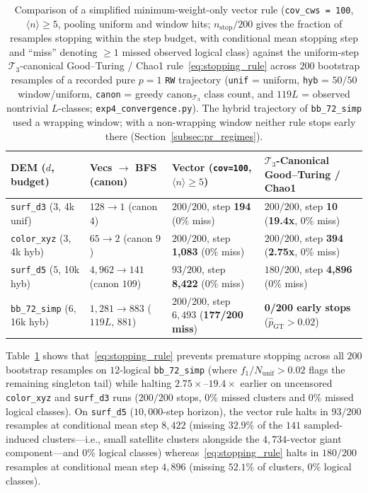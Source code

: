 \documentclass[12pt]{article}
\theoremstyle{definition}
\newcommand{\Tc}{\mathcal{T}_3}
\newcommand{\ttt}[1]{\texttt{#1}}
\begin{document}
\begin{table}[htbp]
\centering
\caption{Comparison of a simplified minimum-weight-only vector rule (\ttt{cov\_cws = 100}, $\langle n \rangle \ge
5$, pooling uniform and window hits; $n_{\mathrm{stop}}/200$ gives the fraction of resamples stopping within the
step budget, with conditional mean stopping step and ``miss'' denoting $\ge 1$ missed observed logical class)
against the uniform-step $\Tc$-canonical Good--Turing / Chao1 rule~\eqref{eq:stopping_rule} across $200$ bootstrap
resamples of a recorded pure $p = 1$ \ttt{RW} trajectory (\ttt{unif} = uniform, \ttt{hyb} = $50/50$ window/uniform,
\ttt{canon} = greedy $\mathrm{canon}_{\Tc}$ class count, and $119L$ = observed nontrivial $L$-classes;
\ttt{exp4\_convergence.py}). The hybrid trajectory of \ttt{bb\_72\_simp} used a wrapping window; with a non-wrapping
window neither rule stops early there (Section~\ref{subsec:pr_regimes}).}\label{tab:conv_bench}
\smallskip
\scriptsize
\setlength{\tabcolsep}{2.3pt}
\begin{tabular}{@{}llll@{}}
\toprule
DEM ($d$, budget) & Vecs $\to$ BFS (canon) & Vector (\ttt{cov=100}, $\langle n \rangle \ge 5$) &
  $\Tc$-Canonical Good--Turing / Chao1 \\
\midrule
\ttt{surf\_d3} ($3$, 4k unif) & $128 \to 1$ (canon $4$) & $200/200$, step \textbf{194} ($0\%$ miss) &
  $200/200$, step \textbf{10} (\textbf{19.4x}, $0\%$ miss) \\
\ttt{color\_xyz} ($3$, 4k hyb) & $65 \to 2$ (canon $9$) & $200/200$, step \textbf{1,083} ($0\%$ miss) &
  $200/200$, step \textbf{394} (\textbf{2.75x}, $0\%$ miss) \\
\ttt{surf\_d5} ($5$, 10k hyb) & $4{,}962 \to 141$ (canon $109$) & $93/200$, step \textbf{8,422} ($0\%$ miss) &
  $180/200$, step \textbf{4,896} ($0\%$ miss) \\
\ttt{bb\_72\_simp} ($6$, 16k hyb) & $1{,}281 \to 883$ ($119L$, $881$) & $200/200$, step $6{,}493$ (\textbf{177/200
  miss}) & \textbf{0/200 early stops} ($\hat{p}_{\mathrm{GT}}{>}0.02$) \\
\bottomrule
\end{tabular}
\end{table}

Table~\ref{tab:conv_bench} shows that~\eqref{eq:stopping_rule} prevents premature stopping across all $200$
bootstrap resamples on $12$-logical \ttt{bb\_72\_simp} (where $f_1 / N_{\mathrm{unif}} > 0.02$ flags the remaining
singleton tail) while halting $2.75\times$--$19.4\times$ earlier on uncensored \ttt{color\_xyz} and \ttt{surf\_d3}
runs ($200/200$ stops, $0\%$ missed clusters and $0\%$ missed logical classes). On \ttt{surf\_d5} ($10{,}000$-step
horizon), the vector rule halts in $93/200$ resamples at conditional mean step $8{,}422$ (missing $32.9\%$ of the
$141$ sampled-induced clusters---i.e., small satellite clusters alongside the $4{,}734$-vector giant component---and
$0\%$ logical classes) whereas~\eqref{eq:stopping_rule} halts in $180/200$ resamples at conditional mean step
$4{,}896$ (missing $52.1\%$ of clusters, $0\%$ logical classes).
\end{document}
